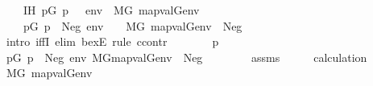 \begin{isabellebody}
\ \ \ \ IH{\isacharcolon}{\kern0pt}\ {\isachardoublequoteopen}{\isacharparenleft}{\kern0pt}{\isasymexists}p{\isasymin}G{\isachardot}{\kern0pt}\ p\ {\isasymtturnstile}\ {\isasymphi}\ env{\isacharparenright}{\kern0pt}\ {\isasymlongleftrightarrow}\ M{\isacharbrackleft}{\kern0pt}G{\isacharbrackright}{\kern0pt}{\isacharcomma}{\kern0pt}\ map{\isacharparenleft}{\kern0pt}val{\isacharparenleft}{\kern0pt}G{\isacharparenright}{\kern0pt}{\isacharcomma}{\kern0pt}env{\isacharparenright}{\kern0pt}\ {\isasymTurnstile}\ {\isasymphi}{\isachardoublequoteclose}\isanewline
\ \ \isanewline
\ \ \ \ {\isachardoublequoteopen}{\isacharparenleft}{\kern0pt}{\isasymexists}p{\isasymin}G{\isachardot}{\kern0pt}\ p\ {\isasymtturnstile}\ Neg{\isacharparenleft}{\kern0pt}{\isasymphi}{\isacharparenright}{\kern0pt}\ env{\isacharparenright}{\kern0pt}\ \ {\isasymlongleftrightarrow}\ \ M{\isacharbrackleft}{\kern0pt}G{\isacharbrackright}{\kern0pt}{\isacharcomma}{\kern0pt}\ map{\isacharparenleft}{\kern0pt}val{\isacharparenleft}{\kern0pt}G{\isacharparenright}{\kern0pt}{\isacharcomma}{\kern0pt}env{\isacharparenright}{\kern0pt}\ {\isasymTurnstile}\ Neg{\isacharparenleft}{\kern0pt}{\isasymphi}{\isacharparenright}{\kern0pt}{\isachardoublequoteclose}\isanewline
%
\isadelimproof
%
\endisadelimproof
%
\isatagproof
{}\isamarkupfalse%
\ {\isacharparenleft}{\kern0pt}intro\ iffI{\isacharcomma}{\kern0pt}\ elim\ bexE{\isacharcomma}{\kern0pt}\ rule\ ccontr{\isacharparenright}{\kern0pt}\ \isanewline
\ \ \isanewline
\ \ \isamarkupfalse%
\ p\ \isanewline
\ \ \isamarkupfalse%
\ {\isachardoublequoteopen}p{\isasymin}G{\isachardoublequoteclose}\ {\isachardoublequoteopen}p\ {\isasymtturnstile}\ Neg{\isacharparenleft}{\kern0pt}{\isasymphi}{\isacharparenright}{\kern0pt}\ env{\isachardoublequoteclose}\ {\isachardoublequoteopen}{\isasymnot}{\isacharparenleft}{\kern0pt}M{\isacharbrackleft}{\kern0pt}G{\isacharbrackright}{\kern0pt}{\isacharcomma}{\kern0pt}map{\isacharparenleft}{\kern0pt}val{\isacharparenleft}{\kern0pt}G{\isacharparenright}{\kern0pt}{\isacharcomma}{\kern0pt}env{\isacharparenright}{\kern0pt}\ {\isasymTurnstile}\ Neg{\isacharparenleft}{\kern0pt}{\isasymphi}{\isacharparenright}{\kern0pt}{\isacharparenright}{\kern0pt}{\isachardoublequoteclose}\isanewline
\ \ \isamarkupfalse%
\ \isanewline
\ \ \isamarkupfalse%
\ assms\isanewline
\ \ \isamarkupfalse%
\ \isamarkupfalse%
\ calculation\isanewline
\ \ \isamarkupfalse%
\ {\isachardoublequoteopen}M{\isacharbrackleft}{\kern0pt}G{\isacharbrackright}{\kern0pt}{\isacharcomma}{\kern0pt}\ map{\isacharparenleft}{\kern0pt}val{\isacharparenleft}{\kern0pt}G{\isacharparenright}{\kern0pt}{\isacharcomma}{\kern0pt}env{\isacharparenright}{\kern0pt}\ {\isasymTurnstile}\ {\isasymphi}{\isachardoublequoteclose}\isanewline

\end{isabellebody}
